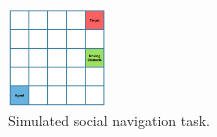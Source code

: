 \documentclass[letterpaper]{article}
\newcommand{\jm}[1]{\textcolor{blue}{Joao: #1}}
\newcommand{\jm}[1]{}
\begin{document}
\begin{figure} 
\centering
\vspace{-2mm}
    \includegraphics[width=0.23\textwidth]{images/gridworld.png}
\vspace{-4mm}
  \caption{Simulated social navigation task.} \label{fig:gridworld}
\vspace{-4mm}
\end{figure}

\end{document}
